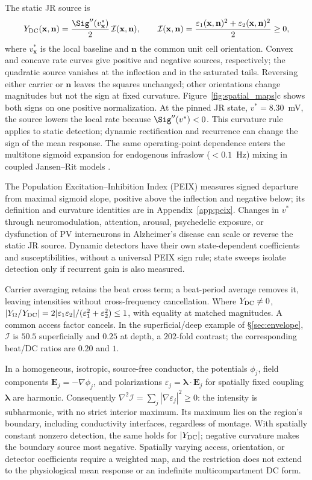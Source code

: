 The static JR source is
\[
Y_{\rm DC}(\mathbf x,\mathbf n)
=\frac{\Sig''(v^*_{\mathbf x})}{2}\,\mathcal I(\mathbf x,\mathbf n),
\qquad
\mathcal I(\mathbf x,\mathbf n)
=\frac{\varepsilon_1(\mathbf x,\mathbf n)^2+
\varepsilon_2(\mathbf x,\mathbf n)^2}{2}\ge0,
\]
where $v^*_{\mathbf x}$ is the local baseline and $\mathbf n$ the common
unit cell orientation. Convex and concave rate curves give positive and
negative sources, respectively; the quadratic source vanishes at the inflection
and in the saturated tails.
Reversing either carrier or $\mathbf n$ leaves the squares unchanged;
other orientations change magnitudes but not the sign at fixed curvature.
Figure~\ref{fig:spatial_maps}c shows both signs on one positive normalization.
At the pinned JR state, $v^*=8.30$~mV, the source lowers the local rate
because $\Sig''(v^*)<0$.
This curvature rule applies to static detection; dynamic rectification and
recurrence can change the sign of the mean response.
The same operating-point dependence enters the multitone sigmoid expansion for
endogenous infraslow ($<0.1$~Hz) mixing in coupled Jansen--Rit models \cite{Just2026mixing}.

\label{sec:opp}
The Population Excitation--Inhibition Index (PEIX) \cite{ruffini2025cfc}
measures signed departure from maximal sigmoid slope, positive above the
inflection and negative below; its definition and curvature identities are
in Appendix~\ref{app:peix}. Changes in $v^*$ through neuromodulation,
attention, arousal, psychedelic exposure, or dysfunction of PV interneurons
in Alzheimer's disease can scale or reverse the static JR source.
Dynamic detectors have their own state-dependent coefficients and susceptibilities, without
a universal PEIX sign rule; state sweeps isolate detection only if recurrent
gain is also measured.

Carrier averaging retains the beat cross term; a beat-period average removes
it, leaving intensities without cross-frequency cancellation. Where
$Y_{\rm DC}\ne0$,
$|Y_\Omega/Y_{\rm DC}|=2|\varepsilon_1\varepsilon_2|/
(\varepsilon_1^2+\varepsilon_2^2)\le1$, with equality at matched magnitudes.
A common access factor cancels. In the superficial/deep example of \S\ref{sec:envelope}, $\mathcal I$ is
$50.5$ superficially and $0.25$ at depth, a $202$-fold contrast;
the corresponding beat/DC ratios are $0.20$ and $1$.

In a homogeneous, isotropic, source-free conductor, the potentials $\phi_j$,
field components $\mathbf E_j=-\nabla\phi_j$, and polarizations
$\varepsilon_j=\boldsymbol\lambda\cdot\mathbf E_j$ for spatially fixed
coupling $\boldsymbol\lambda$ are harmonic. Consequently
$\nabla^2\mathcal I=\sum_j|\nabla\varepsilon_j|^2\ge0$:
the intensity is subharmonic, with no strict interior maximum. Its maximum
lies on the region's boundary, including conductivity interfaces, regardless
of montage. With spatially constant nonzero detection, the same holds for
$|Y_{\rm DC}|$; negative curvature makes the boundary source most negative.
Spatially varying access, orientation, or detector coefficients require a
weighted map, and the restriction does not extend to the physiological mean
response or an indefinite multicompartment DC form.

